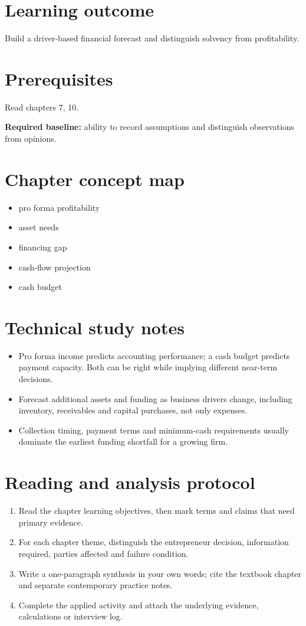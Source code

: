 \documentclass[11pt,letterpaper]{article}
\begin{document}
\SuiteOpen
\section{Learning outcome}
Build a driver-based financial forecast and distinguish solvency from profitability.
\section{Prerequisites}
Read chapters 7, 10.\par\textbf{Required baseline:} ability to record assumptions and distinguish observations from opinions.
\section{Chapter concept map}
\begin{itemize}[leftmargin=*,itemsep=3pt]
\item pro forma profitability
\item asset needs
\item financing gap
\item cash-flow projection
\item cash budget
\end{itemize}

\section{Technical study notes}
\begin{itemize}[leftmargin=*,itemsep=3pt]
\item Pro forma income predicts accounting performance; a cash budget predicts payment capacity. Both can be right while implying different near-term decisions.
\item Forecast additional assets and funding as business drivers change, including inventory, receivables and capital purchases, not only expenses.
\item Collection timing, payment terms and minimum-cash requirements usually dominate the earliest funding shortfall for a growing firm.
\end{itemize}

\section{Reading and analysis protocol}
\begin{enumerate}[leftmargin=*,itemsep=5pt]
\item Read the chapter learning objectives, then mark terms and claims that need primary evidence.
\item For each chapter theme, distinguish the entrepreneur decision, information required, parties affected and failure condition.
\item Write a one-paragraph synthesis in your own words; cite the textbook chapter and separate contemporary practice notes.
\item Complete the applied activity and attach the underlying evidence, calculations or interview log.
\end{enumerate}
\end{document}
